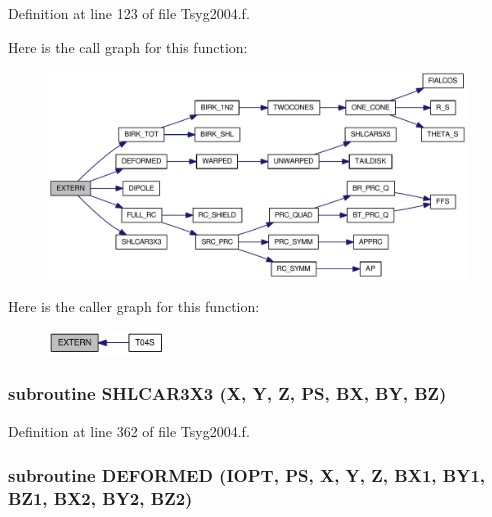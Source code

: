 Definition at line 123 of file Tsyg2004.f.

Here is the call graph for this function:\nopagebreak
\begin{figure}[H]
\begin{center}
\leavevmode
\includegraphics[width=314pt]{_tsyg2004_8f_f4e6ad8b8fa3f74e2914723b740c130c_cgraph}
\end{center}
\end{figure}


Here is the caller graph for this function:\nopagebreak
\begin{figure}[H]
\begin{center}
\leavevmode
\includegraphics[width=88pt]{_tsyg2004_8f_f4e6ad8b8fa3f74e2914723b740c130c_icgraph}
\end{center}
\end{figure}
\hypertarget{_tsyg2004_8f_d52c74fa97a8f0a23954d670e0e0b84a}{
\subsubsection[{SHLCAR3X3}]{\setlength{\rightskip}{0pt plus 5cm}subroutine SHLCAR3X3 (X, \/  Y, \/  Z, \/  PS, \/  BX, \/  BY, \/  BZ)}}
\label{_tsyg2004_8f_d52c74fa97a8f0a23954d670e0e0b84a}




Definition at line 362 of file Tsyg2004.f.\hypertarget{_tsyg2004_8f_62fcead2ce484cd76fdc162bd2e72ca3}{
\subsubsection[{DEFORMED}]{\setlength{\rightskip}{0pt plus 5cm}subroutine DEFORMED (IOPT, \/  PS, \/  X, \/  Y, \/  Z, \/  BX1, \/  BY1, \/  BZ1, \/  BX2, \/  BY2, \/  BZ2)}}
\label{_tsyg2004_8f_62fcead2ce484cd76fdc162bd2e72ca3}




